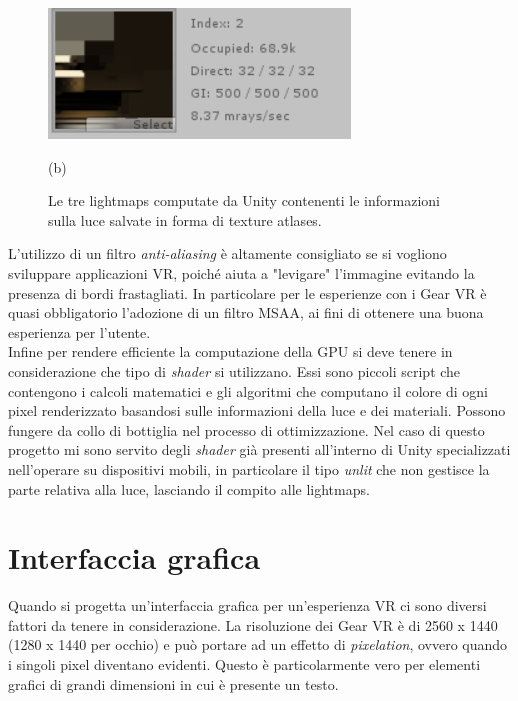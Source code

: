 \begin{figure}[H]
\begin{minipage}[b]{0.49\textwidth}
		\includegraphics[width=\textwidth]{figure/Lightmap3}
		{\footnotesize \centerline{(b)} \par}
	\end{minipage}
	\caption{Le tre lightmaps computate da Unity contenenti le informazioni sulla luce salvate in forma di texture atlases.}
\end{figure}
L'utilizzo di un filtro \textit{anti-aliasing} è altamente consigliato se si vogliono sviluppare applicazioni VR, poiché aiuta a "levigare" l'immagine evitando la presenza di bordi frastagliati. In particolare per le esperienze con i Gear VR è quasi obbligatorio l'adozione di un filtro MSAA, ai fini di ottenere una buona esperienza per l'utente. \\

Infine per rendere efficiente la computazione della GPU si deve tenere in considerazione che tipo di \textit{shader} si utilizzano. Essi sono piccoli script che contengono i calcoli matematici e gli algoritmi che computano il colore di ogni pixel renderizzato basandosi sulle informazioni della luce e dei materiali. Possono fungere da collo di bottiglia nel processo di ottimizzazione. Nel caso di questo progetto mi sono servito degli \textit{shader} già presenti all'interno di Unity specializzati nell'operare su dispositivi mobili, in particolare il tipo \textit{unlit} che non gestisce la parte relativa alla luce, lasciando il compito alle lightmaps.

\newpage

\section{Interfaccia grafica}

Quando si progetta un'interfaccia grafica per un'esperienza VR ci sono diversi fattori da tenere in considerazione. La risoluzione dei Gear VR è di 2560 x 1440 (1280 x 1440 per occhio) e può portare ad un effetto di \textit{pixelation}, ovvero quando i singoli pixel diventano evidenti. Questo è particolarmente vero per elementi grafici di grandi dimensioni in cui è presente un testo.\\

